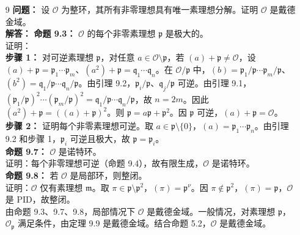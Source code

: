 \documentclass[UTF8]{ctexart}
\begin{document}
\begin{enumerate}
\begin{enumerate}
\item[9]
\textbf{问题：} 设 \(\mathcal{O}\) 为整环，其所有非零理想具有唯一素理想分解。证明 \(\mathcal{O}\) 是戴德金域。\\
\textbf{解答：} \textbf{命题 9.3：} \(\mathcal{O}\) 的每个非零素理想 \(\mathfrak{p}\) 是极大的。\\
证明：\\
\textbf{步骤 1：} 对可逆素理想 \(\mathfrak{p}\)，对任意 \(a \in \mathcal{O} \setminus \mathfrak{p}\)，若 \((a) + \mathfrak{p} \neq \mathcal{O}\)，设 \((a) + \mathfrak{p} = \mathfrak{p}_1 \cdots \mathfrak{p}_m\)、\((a^2) + \mathfrak{p} = \mathfrak{q}_1 \cdots \mathfrak{q}_n\)。在 \(\mathcal{O} / \mathfrak{p}\) 中，\((b) = \mathfrak{p}_1 / \mathfrak{p} \cdots \mathfrak{p}_m / \mathfrak{p}\)、\((b^2) = \mathfrak{q}_1 / \mathfrak{p} \cdots \mathfrak{q}_n / \mathfrak{p}\)。由引理 9.2，\(\mathfrak{p}_i / \mathfrak{p}\)、\(\mathfrak{q}_j / \mathfrak{p}\) 可逆。由引理 9.1，\((\mathfrak{p}_1 / \mathfrak{p})^2 \cdots (\mathfrak{p}_m / \mathfrak{p})^2 = \mathfrak{q}_1 / \mathfrak{p} \cdots \mathfrak{q}_n / \mathfrak{p}\)，故 \(n = 2m\)。因此 \((a^2) + \mathfrak{p} = ((a) + \mathfrak{p})^2\)。则 \(\mathfrak{p} = a \mathfrak{p} + \mathfrak{p}^2\)。因 \(\mathfrak{p}\) 可逆，\((a) + \mathfrak{p} = \mathcal{O}\)。\\
\textbf{步骤 2：} 证明每个非零素理想可逆。取 \(a \in \mathfrak{p} \setminus \{0\}\)，\((a) = \mathfrak{p}_1 \cdots \mathfrak{p}_n\)。由引理 9.2 和步骤 1，\(\mathfrak{p}_i\) 可逆且极大，故 \(\mathfrak{p} = \mathfrak{p}_i\)。\\
\textbf{命题 9.7：} \(\mathcal{O}\) 是诺特环。\\
证明：每个非零理想可逆（命题 9.4），故有限生成，\(\mathcal{O}\) 是诺特环。\\
\textbf{命题 9.8：} 若 \(\mathcal{O}\) 是局部环，则整闭。\\
证明：\(\mathcal{O}\) 仅有素理想 \(\mathfrak{m}\)。取 \(\pi \in \mathfrak{p} \setminus \mathfrak{p}^2\)，\((\pi) = \mathfrak{p}^\nu\)。因 \(\pi \notin \mathfrak{p}^2\)，\((\pi) = \mathfrak{p}\)，\(\mathcal{O}\) 是 PID，故整闭。\\
由命题 9.3、9.7、9.8，局部情况下 \(\mathcal{O}\) 是戴德金域。一般情况，对素理想 \(\mathfrak{p}\)，\(\mathcal{O}_\mathfrak{p}\) 满足条件，由定理 9.9 是戴德金域。结合命题 5.2，\(\mathcal{O}\) 是戴德金域。


\end{enumerate}
\end{enumerate}
\end{document}
